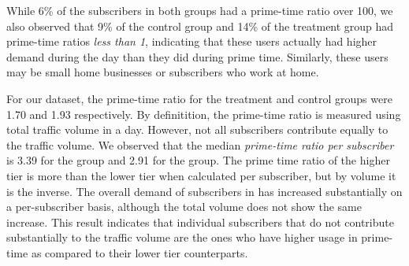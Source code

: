 While 6\% of the subscribers in both groups had a prime-time ratio over
100, we also observed that 9\% of the control group and 14\% of the
treatment group had prime-time ratios {\em less than 1}, indicating that
these users actually had higher demand during the day than they did
during prime time. Similarly, these users may be small home
businesses or subscribers who work at home.


For our dataset, the prime-time ratio for the treatment and control groups
were 1.70 and 1.93 respectively. By definitition, the prime-time ratio is measured using
total traffic volume in a day. However, not all subscribers contribute equally
to the traffic volume. We observed that the median \emph{prime-time ratio per subscriber}
is 3.39 for the \treatment{} group and 2.91 for the \control{} group. 
The prime time ratio of the higher tier is more than the lower tier when calculated per
subscriber, but by volume it is the inverse.
The overall demand of subscribers in \treatment{} has increased substantially
on a per-subscriber basis, although the total volume does not show the same increase.
This result indicates that individual subscribers that do not contribute substantially
to the traffic volume are the ones who have higher usage in prime-time as compared to their
lower tier counterparts.
\fi

